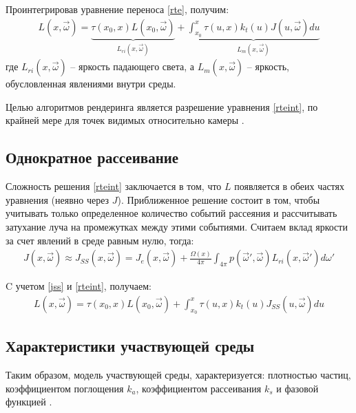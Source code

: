 Проинтегрировав уравнение переноса \eqref{rte}, получим:
\begin{equation}
	\label{rteint}
	\begin{aligned}
		L(x, \vec{\omega}) =
		\underbrace{\tau(x_0, x) L(x_0, \vec{\omega})}_{L_{ri}(x, \vec{\omega})} + \underbrace{\int_{x_0}^{x} \tau(u, x) k_t(u) J(u, \vec{\omega}) du}_{L_m(x, \vec{\omega})}
	\end{aligned}
\end{equation}
где $ L_{ri}(x, \vec{\omega}) $ -- яркость падающего света, а $ L_m(x, \vec{\omega}) $ -- яркость, обусловленная явлениями внутри среды. 

Целью алгоритмов рендеринга является разрешение уравнения \eqref{rteint}, по крайней мере для точек видимых относительно камеры \cite{partmedia}. 

\subsection{Однократное рассеивание}

Сложность решения \ref{rteint} заключается в том, что $L$ появляется в обеих частях уравнения (неявно через $J$). Приближенное решение состоит в том, чтобы учитывать только определенное количество событий рассеяния и рассчитывать затухание луча на промежутках между этими событиями. Считаем вклад яркости за счет явлений в среде равным нулю, тогда:
\begin{equation}
	\label{jss}
	\begin{aligned}
		J(x, \vec{\omega}) \approx J_{SS}(x, \vec{\omega}) = J_e(x, \vec{\omega}) + \frac{\Omega(x)}{4\pi} \int_{4\pi} p(\vec{\omega}', \vec{\omega}) L_{ri}(x, \vec{\omega}') d\omega'
	\end{aligned}
\end{equation}

C учетом \ref{jss} и \ref{rteint}, получаем:
\begin{equation}
	\label{rteintss}
	\begin{aligned}
		L(x, \vec{\omega}) =
		\tau(x_0, x) L(x_0, \vec{\omega}) + \int_{x_0}^{x} \tau(u, x) k_t(u) J_{SS}(u, \vec{\omega}) du
	\end{aligned}
\end{equation}

\subsection{Характеристики участвующей среды}
Таким образом, модель участвующей среды, характеризуется: плотностью частиц, коэффициентом поглощения $k_a$, коэффициентом рассеивания $k_s$ и фазовой функцией \cite{clouds}.


